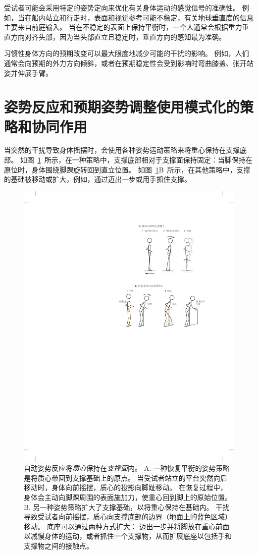 受试者可能会采用特定的姿势定向来优化有关身体运动的感觉信号的准确性。
例如，当在船内站立和行走时，表面和视觉参考可能不稳定，有关地球垂直度的信息主要来自前庭输入。
当在不稳定的表面上保持平衡时，一个人通常会根据重力垂直方向对齐头部，因为当头部直立且稳定时，垂直方向的感知最为准确。


习惯性身体方向的预期改变可以最大限度地减少可能的干扰的影响。
例如，人们通常会向预期的外力方向倾斜，或者在预期稳定性会受到影响时弯曲膝盖、张开站姿并伸展手臂。



\section{姿势反应和预期姿势调整使用模式化的策略和协同作用}

当突然的干扰导致身体摇摆时，会使用各种姿势运动策略来将重心保持在支撑底部。
如图~\ref{fig:36_2}~所示，在一种策略中，支撑底部相对于支撑面保持固定：当脚保持在原位时，身体围绕脚踝旋转回到直立位置。
如图~\ref{fig:36_2}B~所示，在其他策略中，支撑的基础被移动或扩大，例如，通过迈出一步或用手抓住支撑。


\begin{figure}[htbp]
	\centering
	\includegraphics[width=0.75\linewidth]{chap36/fig_36_2}
	\caption{自动姿势反应将\textit{质心}保持在\textit{支撑面}内。
		A. 一种恢复平衡的姿势策略是将质心带回到支撑基础上的原点。
		当受试者站立的平台突然向后移动时，身体向前摇摆，质心的投影向脚趾移动。
		在恢复过程中，身体会主动向脚踝周围的表面施加力，使重心回到脚上的原始位置。
		B. 另一种姿势策略扩大了支撑基础，以将重心保持在基础内。
		干扰导致受试者向前摇摆，质心向支撑底部的边界（地面上的蓝色区域）移动。
		底座可以通过两种方式扩大：
		迈出一步并将脚放在重心前面以减慢身体的运动，或者抓住一个支撑物，从而扩展底座以包括手和支撑物之间的接触点。}
	\label{fig:36_2}
\end{figure}


